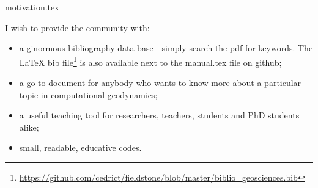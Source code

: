 \begin{flushright} {\tiny {\color{gray} motivation.tex}} \end{flushright}

I wish to provide the community with:
\begin{itemize}
\item a ginormous bibliography data base - simply search the pdf for keywords. The \LaTeX{} bib
 file\footnote{\url{https://github.com/cedrict/fieldstone/blob/master/biblio_geosciences.bib}} 
is also available next to the manual.tex file on github;  
\item a go-to document for anybody who wants to know more about 
      a particular topic in computational geodynamics;
\item a useful teaching tool for researchers, teachers, students and PhD students alike; 
\item small, readable, educative codes. 
\end{itemize}


